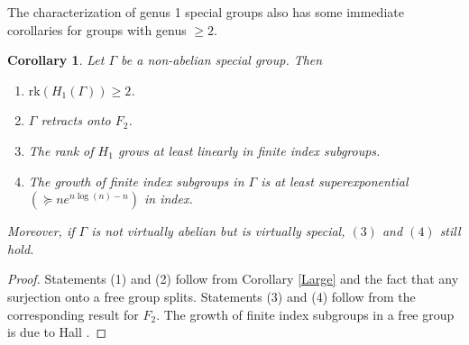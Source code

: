 \documentclass[11pt]{amsart}
\numberwithin{thm}{section}
\newtheorem{corollary}[thm]{Corollary}
\theoremstyle{remark}
\theoremstyle{definition}
\newcommand{\Z}{\mathbb{Z}}
\newcommand{\what}{\widehat}
\begin{document}
%

The characterization of genus 1 special groups also has some immediate corollaries for groups with genus $\geq 2$.

\begin{corollary} Let $\Gamma$ be a non-abelian special group.  Then \begin{enumerate}
\item $\text{rk}(H_1(\Gamma))\geq2$.  
\item $\Gamma$ retracts onto $F_2$.
\item The rank of $H_1$ grows at least linearly in finite index subgroups.  
\item The growth of finite index subgroups in $\Gamma$ is at least superexponential $(\succeq ne^{n\log(n)-n})$ in index.  
\end{enumerate}
Moreover, if $\Gamma$ is not virtually abelian but is virtually special, $(3)$ and $(4)$ still hold.  
\end{corollary}
\begin{proof} Statements (1) and (2) follow from Corollary \ref{Large} and the fact that any surjection onto a free group splits.  Statements (3) and (4) follow from the corresponding result for $F_2$. The growth of finite index subgroups in a free group is due to Hall \cite{Hall49}.   
\end{proof}
\end{document}
